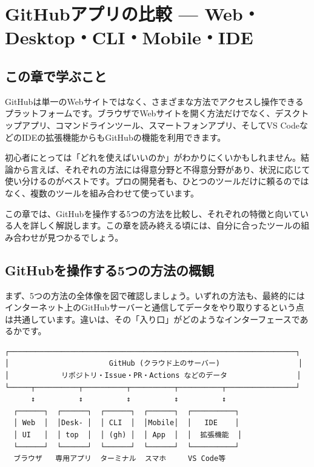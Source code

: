 \chapter{GitHubアプリの比較 --- Web・Desktop・CLI・Mobile・IDE}

\section{この章で学ぶこと}

GitHubは単一のWebサイトではなく、さまざまな方法でアクセスし操作できるプラットフォームです。ブラウザでWebサイトを開く方法だけでなく、デスクトップアプリ、コマンドラインツール、スマートフォンアプリ、そしてVS CodeなどのIDEの拡張機能からもGitHubの機能を利用できます。

初心者にとっては「どれを使えばいいのか」がわかりにくいかもしれません。結論から言えば、それぞれの方法には得意分野と不得意分野があり、状況に応じて使い分けるのがベストです。プロの開発者も、ひとつのツールだけに頼るのではなく、複数のツールを組み合わせて使っています。

この章では、GitHubを操作する5つの方法を比較し、それぞれの特徴と向いている人を詳しく解説します。この章を読み終える頃には、自分に合ったツールの組み合わせが見つかるでしょう。

\section{GitHubを操作する5つの方法の概観}

まず、5つの方法の全体像を図で確認しましょう。いずれの方法も、最終的にはインターネット上のGitHubサーバーと通信してデータをやり取りするという点は共通しています。違いは、その「入り口」がどのようなインターフェースであるかです。

\begin{lstlisting}[language={}]
┌──────────────────────────────────────────────────────────────────┐
│                       GitHub (クラウド上のサーバー)                  │
│            リポジトリ・Issue・PR・Actions などのデータ                │
└─────┬──────────┬──────────┬──────────┬──────────┬────────────────┘
      ↕          ↕          ↕          ↕          ↕
  ┌──────┐  ┌──────┐  ┌──────┐  ┌──────┐  ┌──────────┐
  │ Web  │  │Desk- │  │ CLI  │  │Mobile│  │   IDE    │
  │ UI   │  │ top  │  │ (gh) │  │ App  │  │  拡張機能  │
  └──────┘  └──────┘  └──────┘  └──────┘  └──────────┘
  ブラウザ   専用アプリ  ターミナル  スマホ     VS Code等
\end{lstlisting}

